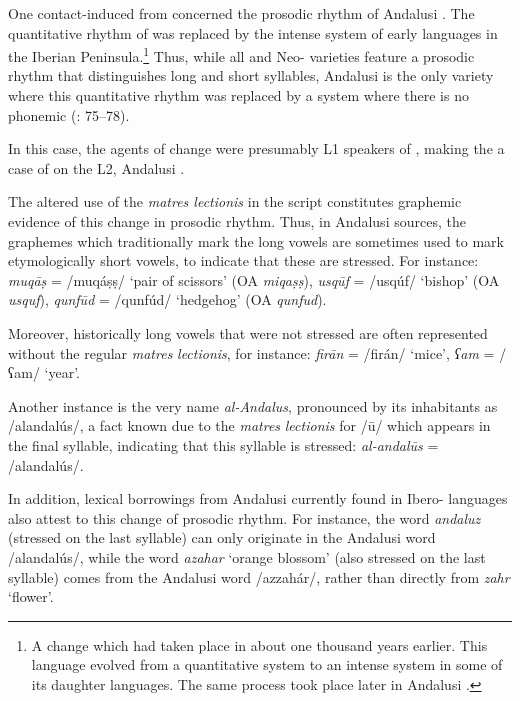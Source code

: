 \documentclass[output=paper,modfonts,nonflat]{langsci/langscibook}
\begin{document}
One contact-induced  from  concerned the prosodic rhythm of Andalusi . The quantitative rhythm of   was replaced by the intense  system of early  languages in the Iberian Peninsula.\footnote{A change which had taken place in  about one thousand years earlier. This language evolved from a quantitative  system to an intense  system in some of its daughter languages. The same process took place later in Andalusi .} Thus, while all   and Neo- varieties feature a prosodic rhythm that distinguishes long and short syllables, Andalusi  is the only variety where this quantitative rhythm was replaced by a system where there is no phonemic  (\citealt{Corriente1977,Corriente1992chapter,CorrientePereiraVicente2015}: 75–78).

In this case, the agents of change were presumably L1 speakers of , making the  a case of  on the L2, Andalusi . 

The altered use of the \textit{matres lectionis} in the  script constitutes graphemic evidence of this change in prosodic rhythm. Thus, in Andalusi sources, the graphemes which traditionally mark the   long vowels are sometimes used to mark etymologically short vowels, to indicate that these are stressed. For instance: {} \textit{{muqāṣ}} = /muqáṣṣ/ ‘pair of scissors’ (OA \textit{miqaṣṣ}), {} \textit{usqūf} = /usqúf/ ‘bishop’ (OA \textit{usquf}), {} \textit{qunfūd} = /qunfúd/ ‘hedgehog’ (OA \textit{qunfud}).  

Moreover, historically long vowels that were not stressed are often represented without the regular \textit{matres} \textit{lectionis}, for instance: {} \textit{firān} = /firán/ ‘mice’, {} \textit{ʕam} = /ʕam/ ‘year’.

Another instance is the very name \textit{al-Andalus}, pronounced by its inhabitants as /alandalús/, a fact known due to the \textit{matres} \textit{lectionis} for /ū/ which appears in the final syllable, indicating that this syllable is stressed: {} \textit{al-andalūs} = /alandalús/.

In addition, lexical borrowings from Andalusi  currently found in Ibero- languages also attest to this change of prosodic rhythm. For instance, the  word \textit{andaluz} (stressed on the last syllable) can only originate in the Andalusi word /alandalús/, while the  word \textit{azahar} ‘orange blossom’ (also stressed on the last syllable) comes from the Andalusi word /azzahár/, rather than directly from   \textit{zahr} ‘flower’.
\end{document}
